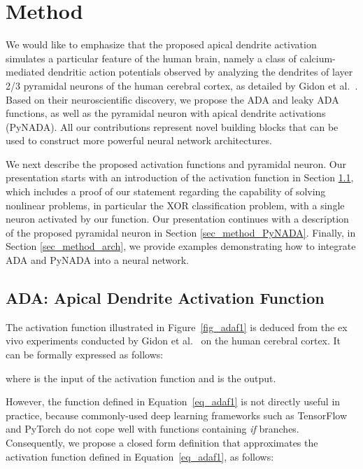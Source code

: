 \documentclass[pdflatex,sn-mathphys]{sn-jnl}
\theoremstyle{thmstyleone}
\theoremstyle{thmstyletwo}\newtheorem{example}{Example}\newtheorem{remark}{Remark}
\theoremstyle{thmstylethree}\newtheorem{definition}{Definition}\DeclareMathOperator{\sinc}{sinc}
\begin{document}
\vspace{-0.15cm}
\section{Method}
\label{sec_method}

We would like to emphasize that the proposed apical dendrite activation simulates a particular feature of the human brain, namely a class of calcium-mediated dendritic action potentials observed by analyzing the dendrites of layer 2/3 pyramidal neurons of the human cerebral cortex, as detailed by Gidon et al.~\cite{Gidon-S-2020}. Based on their neuroscientific discovery, we propose the ADA and leaky ADA functions, as well as the pyramidal neuron with apical dendrite activations (PyNADA). All our contributions represent novel building blocks that can be used to construct more powerful neural network architectures.

We next describe the proposed activation functions and pyramidal neuron. Our presentation starts with an introduction of the activation function in Section \ref{sec_method_ADA}, which includes a proof of our statement regarding the capability of solving nonlinear problems, in particular the XOR classification problem, with a single neuron activated by our function. Our presentation continues with a description of the proposed pyramidal neuron in Section \ref{sec_method_PyNADA}. Finally, in Section {\ref{sec_method_arch}}, we provide examples demonstrating how to integrate ADA and PyNADA into a neural network.

\subsection{ADA: Apical Dendrite Activation Function}
\label{sec_method_ADA}

The activation function illustrated in Figure~\ref{fig_adaf1} is deduced from the ex vivo experiments conducted by Gidon et al.~\cite{Gidon-S-2020} on the human cerebral cortex. It can be formally expressed as follows:

where  is the input of the activation function and  is the output. 

However, the function defined in Equation~\eqref{eq_adaf1} is not directly useful in practice, because commonly-used deep learning frameworks such as TensorFlow \citep{Abadi-OSDI-2016} and PyTorch \citep{Paszke-NeurIPS-2019} do not cope well with functions containing \emph{if} branches. Consequently, we propose a closed form definition that approximates the activation function defined in Equation~\eqref{eq_adaf1}, as follows: 
\end{document}
